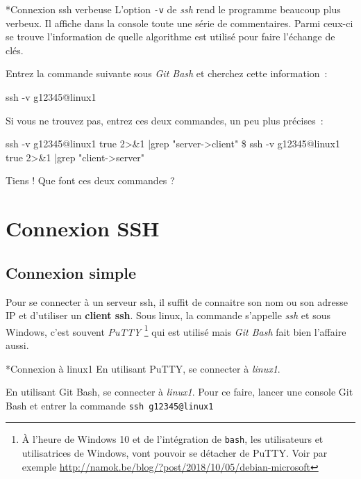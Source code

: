 \documentclass[a4paper,11pt]{article}
\begin{document}
\begin{Exercice}*{Connexion ssh verbeuse}
	L'option \texttt{-v} de \textit{ssh} rend le programme beaucoup plus verbeux.
	Il affiche dans la console toute une série de commentaires. Parmi ceux-ci
	se trouve l'information de quelle algorithme est utilisé pour faire
	l'échange de clés. 

	Entrez la commande suivante sous \textit{Git Bash} et cherchez cette
	information~:

	\begin{term}
		ssh -v g12345@linux1
	\end{term}

	Si vous ne trouvez pas, entrez ces deux commandes, un peu plus précises~:

	\begin{term}
		ssh -v g12345@linux1 true 2>\&1 |grep "server->client"
		\$ ssh -v g12345@linux1 true 2>\&1 |grep "client->server"
	\end{term}

	Tiens ! Que font ces deux commandes ? 

\end{Exercice}





\clearpage
\section{Connexion SSH}
\label{connexion-ssh}

\secttoc 

\subsection{Connexion simple}

Pour se connecter à un serveur ssh, il suffit de connaitre son nom ou son
adresse IP et d'utiliser un \textbf{client ssh}. Sous linux, la commande s'appelle \textit{ssh} et sous Windows, c'est souvent \textit{PuTTY}
\footnote{À l'heure de Windows 10 et de l'intégration de \texttt{bash}, les
utilisateurs et utilisatrices de Windows, vont pouvoir se détacher de PuTTY. Voir par exemple \url{http://namok.be/blog/?post/2018/10/05/debian-microsoft}}
qui est utilisé mais \textit{Git Bash} fait bien l'affaire aussi. 

\begin{Exercice}*{Connexion à linux1}
	En utilisant PuTTY, se connecter à \textit{linux1}. 

	En utilisant Git Bash, se connecter à \textit{linux1}. Pour ce faire, lancer
	une console Git Bash et entrer la commande \texttt{ssh g12345@linux1}

\end{Exercice}
\end{document}
